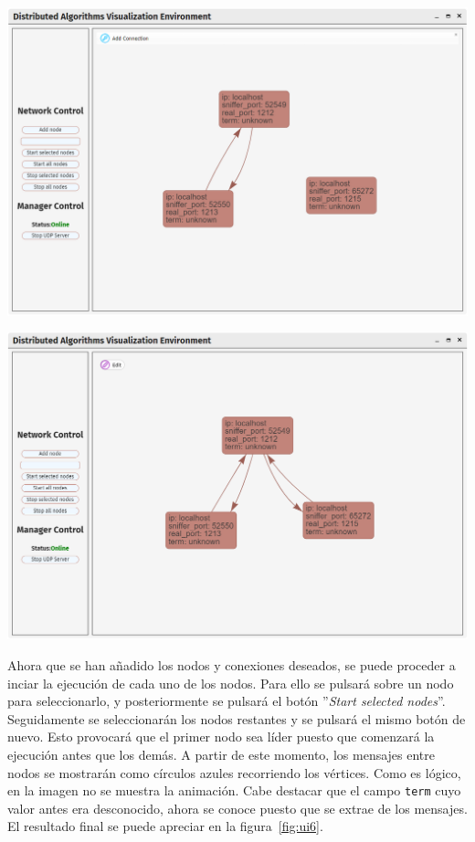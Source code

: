{
\centering
\includegraphics[width=0.9\linewidth]{imagenes/ui4}
\label{fig:ui4}
}

{
\centering
\includegraphics[width=0.9\linewidth]{imagenes/ui5}
\label{fig:ui5}
}

\newpage

Ahora que se han añadido los nodos y conexiones deseados, se puede proceder a inciar la ejecución de cada uno de los nodos. Para ello se pulsará sobre un nodo para seleccionarlo, y posteriormente se pulsará el botón ''\textit{Start selected nodes}''. Seguidamente se seleccionarán los nodos restantes y se pulsará el mismo botón de nuevo. Esto provocará que el primer nodo sea líder puesto que comenzará la ejecución antes que los demás. A partir de este momento, los mensajes entre nodos se mostrarán como círculos azules recorriendo los vértices. Como es lógico, en la imagen no se muestra la animación. Cabe destacar que el campo \texttt{term} cuyo valor antes era desconocido, ahora se conoce puesto que se extrae de los mensajes. El resultado final se puede apreciar en la figura~\ref{fig:ui6}.

